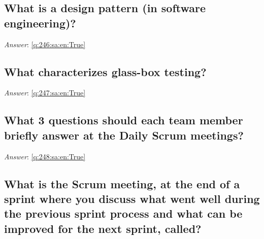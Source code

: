 \documentclass[a4paper,11pt,oneside]{article}
\begin{document}
\begin{sloppypar}
\subsection{What is a design pattern (in software engineering)?}

\label{q:246:sa:en:False}

\vspace{2cm}

\noindent\makebox[\textwidth]{\hrulefill}

\vspace{1cm}

\textit{Answer}: \autoref{q:246:sa:en:True}



\subsection{What characterizes glass-box testing?}

\label{q:247:sa:en:False}

\vspace{2cm}

\noindent\makebox[\textwidth]{\hrulefill}

\vspace{1cm}

\textit{Answer}: \autoref{q:247:sa:en:True}



\subsection{What 3 questions should each team member briefly answer at the Daily Scrum meetings?}

\label{q:248:sa:en:False}

\vspace{2cm}

\noindent\makebox[\textwidth]{\hrulefill}

\vspace{1cm}

\textit{Answer}: \autoref{q:248:sa:en:True}



\subsection{What is the Scrum meeting, at the end of a sprint where you discuss what went well during the previous sprint process and what can be improved for the next sprint, called?}

\label{q:249:sa:en:False}


\end{sloppypar}
\end{document}
